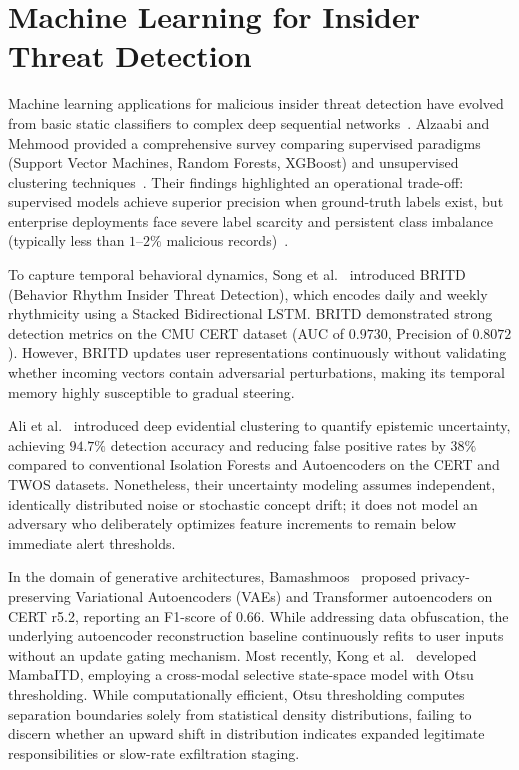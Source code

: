 \documentclass[12pt,a4paper]{report}
\begin{document}
\section{Machine Learning for Insider Threat Detection}
Machine learning applications for malicious insider threat detection have evolved from basic static classifiers to complex deep sequential networks~\cite{alzaabi2024review}. Alzaabi and Mehmood provided a comprehensive survey comparing supervised paradigms (Support Vector Machines, Random Forests, XGBoost) and unsupervised clustering techniques~\cite{cortes1995support, chen2016xgboost, liu2008isolation}. Their findings highlighted an operational trade-off: supervised models achieve superior precision when ground-truth labels exist, but enterprise deployments face severe label scarcity and persistent class imbalance (typically less than $1$--$2\%$ malicious records)~\cite{glasser2013cert}.

To capture temporal behavioral dynamics, Song et al.~\cite{song2024britd} introduced BRITD (Behavior Rhythm Insider Threat Detection), which encodes daily and weekly rhythmicity using a Stacked Bidirectional LSTM. BRITD demonstrated strong detection metrics on the CMU CERT dataset (AUC of $0.9730$, Precision of $0.8072$). However, BRITD updates user representations continuously without validating whether incoming vectors contain adversarial perturbations, making its temporal memory highly susceptible to gradual steering.

Ali et al.~\cite{ali2025realtime} introduced deep evidential clustering to quantify epistemic uncertainty, achieving $94.7\%$ detection accuracy and reducing false positive rates by $38\%$ compared to conventional Isolation Forests and Autoencoders on the CERT and TWOS datasets. Nonetheless, their uncertainty modeling assumes independent, identically distributed noise or stochastic concept drift; it does not model an adversary who deliberately optimizes feature increments to remain below immediate alert thresholds.

In the domain of generative architectures, Bamashmoos~\cite{bamashmoos2025adaptive} proposed privacy-preserving Variational Autoencoders (VAEs) and Transformer autoencoders on CERT r5.2, reporting an F1-score of $0.66$. While addressing data obfuscation, the underlying autoencoder reconstruction baseline continuously refits to user inputs without an update gating mechanism. Most recently, Kong et al.~\cite{kong2026mambaitd} developed MambaITD, employing a cross-modal selective state-space model with Otsu thresholding. While computationally efficient, Otsu thresholding computes separation boundaries solely from statistical density distributions, failing to discern whether an upward shift in distribution indicates expanded legitimate responsibilities or slow-rate exfiltration staging.
\end{document}
